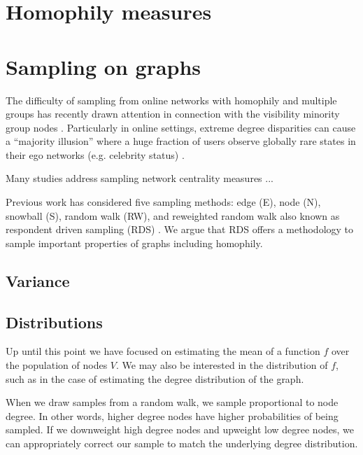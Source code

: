 \documentclass[a4paper]{article}
\begin{document}
\section{Homophily measures}


\section{Sampling on graphs}

The difficulty of sampling from online networks with homophily and multiple groups has recently drawn attention \cite{wagner_sampling_2017} in connection with the visibility minority group nodes \cite{karimi_visibility_2017}. Particularly in online settings, extreme degree disparities can cause a ``majority illusion'' where a huge fraction of users observe globally rare states in their ego networks (e.g. celebrity status) \cite{lerman_majority_2016}.

Many studies address sampling network centrality measures ... \cite{}

Previous work has considered five sampling methods: edge (E), node (N), snowball (S), random walk (RW), and reweighted random walk also known as respondent driven sampling (RDS) \cite{wagner_sampling_2017,wang_sampling_2015,heckathorn_respondent-driven_2002}. We argue that RDS offers a methodology to sample important properties of graphs including homophily.




\subsection{Variance}

\subsection{Distributions}

Up until this point we have focused on estimating the mean of a function $f$ over the population of nodes $V$. We may also be interested in the distribution of $f$, such as in the case of estimating the degree distribution of the graph.

When we draw samples from a random walk, we sample proportional to node degree. In other words, higher degree nodes have higher probabilities of being sampled. If we downweight high degree nodes and upweight low degree nodes, we can appropriately correct our sample to match the underlying degree distribution.
\end{document}
